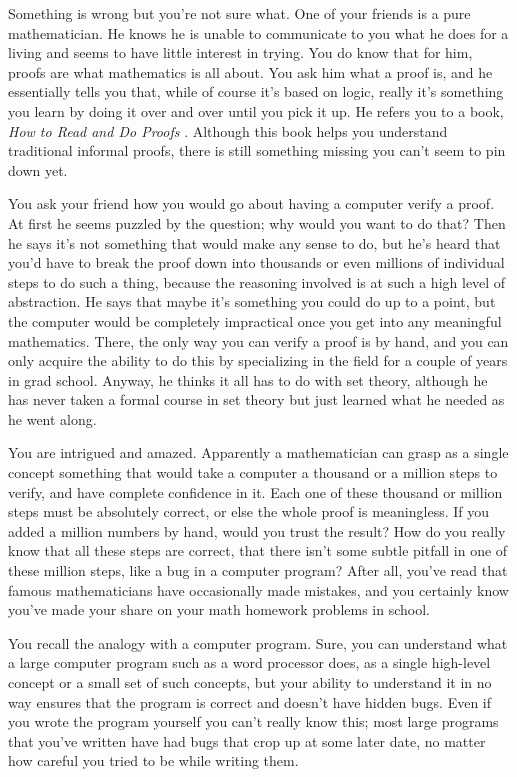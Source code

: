 Something is wrong but you're not sure what.  One of your friends is a pure
mathematician.  He knows he is unable to communicate to you what he does for a
living and seems to have little interest in trying.  You do know that for him,
proofs are what mathematics is all about. You ask him what a proof is, and he
essentially tells you that, while of course it's based on logic, really it's
something you learn by doing it over and over until you pick it up.  He refers
you to a book, {\em How to Read and Do Proofs} \cite{Solow}.  Although this book helps you understand traditional informal proofs,
there is still something missing you can't seem to pin down yet.

You ask your friend how you would go about having a computer verify a proof.
At first he seems puzzled by the question; why would you want to do that?
Then he says it's not something that would make any sense to do, but he's
heard that you'd have to break the proof down into thousands or even millions
of individual steps to do such a thing, because the reasoning involved is at
such a high level of abstraction.  He says that maybe it's something you could
do up to a point, but the computer would be completely impractical once you
get into any meaningful mathematics.  There, the only way you can verify a
proof is by hand, and you can only acquire the ability to do this by
specializing in the field for a couple of years in grad school.  Anyway, he
thinks it all has to do with set theory, although he has never taken a formal
course in set theory but just learned what he needed as he went along.

You are intrigued and amazed.  Apparently a mathematician can grasp as a
single concept something that would take a computer a thousand or a million
steps to verify, and have complete confidence in it.  Each one of these
thousand or million steps must be absolutely correct, or else the whole proof
is meaningless.  If you added a million numbers by hand, would you trust the
result?  How do you really know that all these steps are correct, that there
isn't some subtle pitfall in one of these million steps, like a bug in a
computer program?  After all, you've read that
famous mathematicians have occasionally made mistakes, and you certainly know
you've made your share on your math homework problems in school.

You recall the analogy with a computer program.  Sure, you can understand what
a large computer program such as a word processor does, as a single high-level
concept or a small set of such concepts, but your ability to understand it in
no way ensures that the program is correct and doesn't have hidden bugs.  Even
if you wrote the program yourself you can't really know this; most large
programs that you've written have had bugs that crop up at some later date, no
matter how careful you tried to be while writing them.

